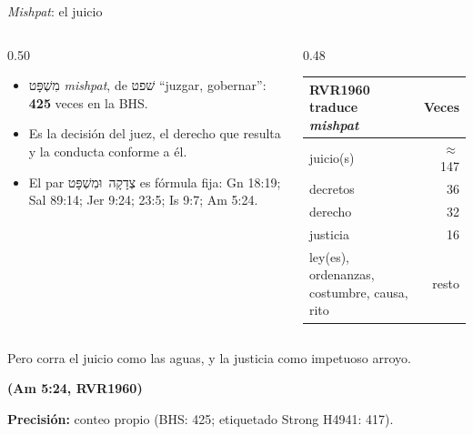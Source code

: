 \documentclass[hyperref={bookmarks=false},aspectratio=169]{beamer}
\newcommand{\heb}[1]{\mbox{\foreignlanguage{hebrew}{#1}}}
\newcommand{\fuente}[1]{\par\hfill{\upshape\bfseries\footnotesize\textcolor{azul}{#1}}}
\newcommand{\precision}[1]{{\footnotesize\color{gris}\textbf{Precisión:} #1}}
\begin{document}
\begin{frame}{\emph{Mishpat}: el juicio}
\begin{columns}[c,onlytextwidth]
\begin{column}{0.50\textwidth}\small
\begin{itemize}
\item \heb{מִשְׁפָּט} \emph{mishpat}, de \heb{שׁפט} ``juzgar, gobernar'': \textbf{425} veces en la BHS.
\item Es la decisión del juez, el derecho que resulta y la conducta conforme a él.
\item El par \heb{צְדָקָה וּמִשְׁפָּט} es fórmula fija: Gn 18:19; Sal 89:14; Jer 9:24; 23:5; Is 9:7; Am 5:24.
\end{itemize}
\end{column}
\begin{column}{0.48\textwidth}
\scriptsize\renewcommand{\arraystretch}{1.12}
\begin{tabular}{@{}>{\RaggedRight\arraybackslash}p{3.0cm}r@{}}
\toprule
\textbf{RVR1960 traduce \emph{mishpat}} & \textbf{Veces} \\ \midrule
juicio(s) & $\approx$147 \\
decretos & 36 \\
derecho & 32 \\
justicia & 16 \\
ley(es), ordenanzas, costumbre, causa, rito & resto \\
\bottomrule
\end{tabular}
\end{column}
\end{columns}\par\medskip
\begin{cita}Pero corra el juicio como las aguas, y la justicia como impetuoso arroyo.\fuente{(Am 5:24, RVR1960)}\end{cita}
\precision{conteo propio (BHS: 425; etiquetado Strong H4941: 417).}
\end{frame}
\end{document}
